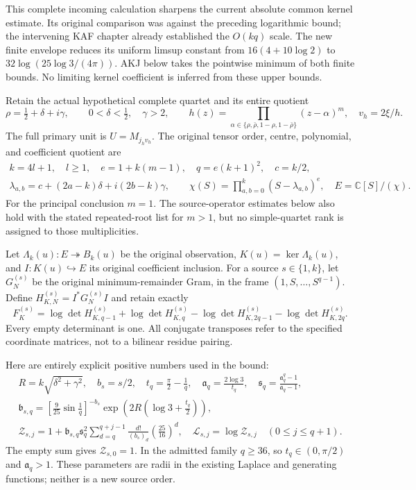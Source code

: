 \documentclass[11pt,a4paper]{article}
\begin{document}
This complete incoming calculation sharpens the current absolute common
kernel estimate. Its original comparison was against the preceding
logarithmic bound; the intervening KAF chapter already established
the $O(kq)$ scale. The new finite envelope reduces its uniform limsup
constant from $16(4+10\log2)$ to $32\log(25\log3/(4\pi))$.
AKJ below takes the pointwise minimum of both finite bounds. No
limiting kernel coefficient is inferred from these upper bounds.

Retain the actual hypothetical complete quartet and its entire quotient
\[
 \rho=\tfrac12+\delta+i\gamma,\qquad 0<\delta<\tfrac12,\quad \gamma>2,
 \qquad h(z)=\prod_{\alpha\in\{\rho,\bar\rho,1-\rho,1-\bar\rho\}}
 (z-\alpha)^m,\quad v_h=2\xi/h.
\]
The full primary unit is $U=M_{j_hv_h}$. The original tensor order, centre,
polynomial, and coefficient quotient are
\[
\begin{gathered}
 k=4l+1,\quad l\ge1,\quad e=1+k(m-1),\quad q=e(k+1)^2,\quad c=k/2,\\
 \lambda_{a,b}=c+(2a-k)\delta+i(2b-k)\gamma,\qquad
 \chi(S)=\prod_{a,b=0}^k(S-\lambda_{a,b})^e,
 \quad E=\mathbb C[S]/(\chi).
\end{gathered}\tag{AKS1}
\]
For the principal conclusion $m=1$. The source-operator estimates below
also hold with the stated repeated-root list for $m>1$, but no simple-quartet
rank is assigned to those multiplicities.

Let $\Lambda_k(u):E\twoheadrightarrow B_k(u)$ be the original observation,
$K(u)=\ker\Lambda_k(u)$, and $I:K(u)\hookrightarrow E$ its original
coefficient inclusion. For a source $s\in\{1,k\}$, let $G_N^{(s)}$ be the
original minimum-remainder Gram, in the frame $(1,S,\ldots,S^{q-1})$.
Define $H_{K,N}^{(s)}=I^*G_N^{(s)}I$ and retain exactly
\[
 F_K^{(s)}=
 \log\det H_{K,q-1}^{(s)}+\log\det H_{K,q}^{(s)}
 -\log\det H_{K,2q-1}^{(s)}-\log\det H_{K,2q}^{(s)}.
 \tag{AKS2}
\]
Every empty determinant is one. All conjugate transposes refer to the
specified coordinate matrices, not to a bilinear residue pairing.

Here are entirely explicit positive numbers used in the bound:
\[
\begin{gathered}
 R=k\sqrt{\delta^2+\gamma^2},\quad b_s=s/2,\quad
 t_q=\frac\pi2-\frac1q,\quad \mathfrak a_q=\frac{2\log3}{t_q},\quad
 \mathfrak s_q=\frac{\mathfrak a_q^q-1}{\mathfrak a_q-1},\\
 \mathfrak b_{s,q}=\left[\frac9{25}\sin\frac1q\right]^{-b_s}
       \exp\left(2R\left(\log3+\frac{t_q}{2}\right)\right),\\
 \mathcal Z_{s,j}=1+\mathfrak b_{s,q}\mathfrak s_q^2
        \sum_{d=q}^{q+j-1}\frac{d!}{(b_s)_d}
                          \left(\frac{25}{16}\right)^d,
 \quad \mathcal L_{s,j}=\log \mathcal Z_{s,j}\quad (0\le j\le q+1).
\end{gathered}\tag{AKS3}
\]
The empty sum gives $\mathcal Z_{s,0}=1$. In the admitted family $q\ge36$, so
$t_q\in(0,\pi/2)$ and $\mathfrak a_q>1$. These parameters are radii in the existing
Laplace and generating functions; neither is a new source order.
\end{document}
